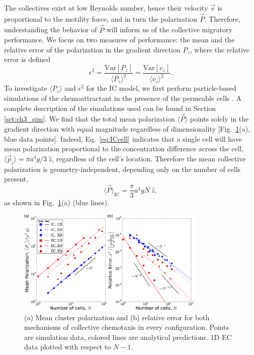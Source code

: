 The collectives exist at low Reynolds number, hence their velocity $\vec{v}$ is proportional to the motility force, and in turn the polarization $\vec{P}$.
Therefore, understanding the behavior of $\vec{P}$ will inform us of the collective migratory performance. We focus on two measures of performance: the mean and the relative error of the polarization in the gradient direction $P_z$, where the relative error is defined
\begin{equation} \label{eq:error1}
    \epsilon^2
    = \frac{\text{Var}[P_z]}{\langle P_z \rangle^2}
    = \frac{\text{Var}[v_z]}{\langle v_z \rangle^2}.
\end{equation}
To investigate $\langle P_z\rangle$ and $\epsilon^2$ for the IC model,
we first perform particle-based simulations of the chemoattractant in the presence of the permeable cells \cite{ch3code}. A complete description of the simulations used can be found in Section \ref{sct:ch3_sim}. We find that the total mean polarization $\langle \vec{P} \rangle$ points solely in the gradient direction with equal magnitude regardless of dimensionality [Fig.\ \ref{fig:2}(a), blue data points]. Indeed, Eq.\ \ref{eq:ICcell} indicates that a single cell will have mean polarization proportional to the concentration difference across the cell,
$\langle \vec{p}_i \rangle = \pi a^4g/3 \ \hat{z}$,
regardless of the cell's location.
Therefore the mean collective polarization is geometry-independent, depending only on the number of cells present,
\begin{equation} \label{eq:ICmean}
    \langle \vec{P} \rangle_\text{IC} = \frac{\pi}{3} a^4gN \ \hat{z},
\end{equation}
as shown in Fig.\ \ref{fig:2}(a) (blue lines).

\begin{figure}[ht]
    \centering
        \includegraphics[width=0.8\textwidth]{../fig/ch3_fig2.pdf}
    \caption{(a) Mean cluster polarization and (b) relative error for both mechanisms of collective chemotaxis in every configuration. Points are simulation data, colored lines are analytical predictions. 1D EC data plotted with respect to $N-1$.} \label{fig:2}
\end{figure}

